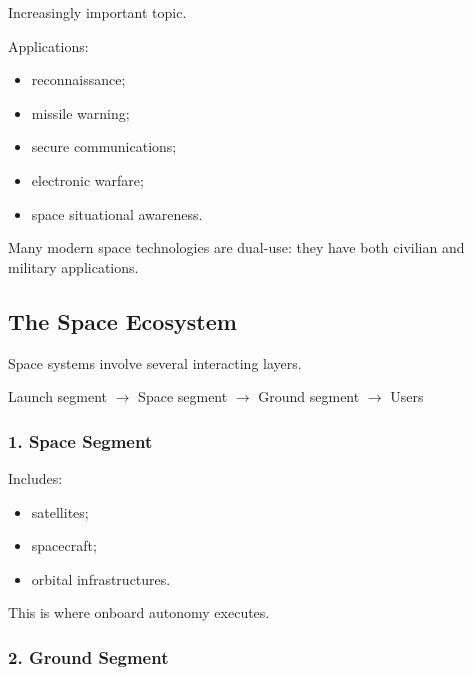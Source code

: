 \documentclass[10pt,a4paper,twocolumn]{article}
\begin{document}
Increasingly important topic.

Applications:
\begin{itemize}
    \item reconnaissance;
    \item missile warning;
    \item secure communications;
    \item electronic warfare;
    \item space situational awareness.
\end{itemize}

\begin{warningbox}
    Many modern space technologies are dual-use:
    they have both civilian and military applications.
\end{warningbox}


\subsection{The Space Ecosystem}

Space systems involve several interacting layers.

\begin{center}
    Launch segment
    $\rightarrow$
    Space segment
    $\rightarrow$
    Ground segment
    $\rightarrow$
    Users
\end{center}


\subsubsection*{1. Space Segment}

Includes:
\begin{itemize}
    \item satellites;
    \item spacecraft;
    \item orbital infrastructures.
\end{itemize}

This is where onboard autonomy executes.


\subsubsection*{2. Ground Segment}
\end{document}
